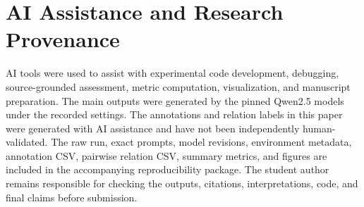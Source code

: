 \documentclass[acmsmall,screen,nonacm]{acmart}
\begin{document}
\section*{AI Assistance and Research Provenance}
AI tools were used to assist with experimental code development, debugging, source-grounded assessment, metric computation, visualization, and manuscript preparation. The main outputs were generated by the pinned Qwen2.5 models under the recorded settings. The annotations and relation labels in this paper were generated with AI assistance and have not been independently human-validated. The raw run, exact prompts, model revisions, environment metadata, annotation CSV, pairwise relation CSV, summary metrics, and figures are included in the accompanying reproducibility package. The student author remains responsible for checking the outputs, citations, interpretations, code, and final claims before submission.



\end{document}

